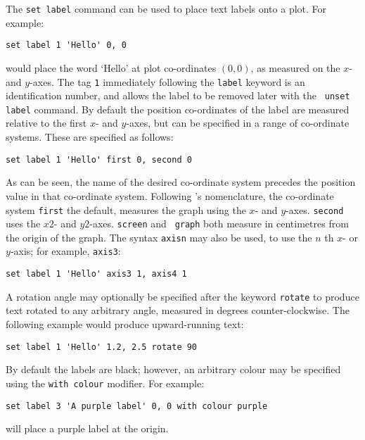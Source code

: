 The {\tt set label} command can be used to place text labels onto a plot.  For
example:

\begin{verbatim}
set label 1 'Hello' 0, 0
\end{verbatim}

\noindent would place the word `Hello' at plot co-ordinates $(0,0)$, as measured on the $x$-
and $y$-axes.  The tag {\tt 1} immediately following the {\tt label} keyword is an
identification number, and allows the label to be removed later with the {\tt
unset label} command.  By default the position co-ordinates of the label are
measured relative to the first $x$- and $y$-axes, but can be specified in a
range of co-ordinate systems. These are specified as follows:

\begin{verbatim}
set label 1 'Hello' first 0, second 0
\end{verbatim}

As can be seen, the name of the desired co-ordinate system precedes the position
value in that co-ordinate system. Following \gnuplot's nomenclature, the
co-ordinate system {\tt first} the default, measures the graph using the $x$- and
$y$-axes. {\tt second} uses the $x2$- and $y2$-axes.  {\tt screen} and {\tt
graph} both measure in centimetres from the origin of the graph.  The syntax
{\tt axisn} may also be used, to use the $n$ th $x$- or $y$-axis; for example,
{\tt axis3}:

\begin{verbatim}
set label 1 'Hello' axis3 1, axis4 1
\end{verbatim}

A rotation angle may optionally be specified after the keyword {\tt rotate}
to produce text rotated to any arbitrary angle, measured in degrees
counter-clockwise. The following example would produce upward-running text:

\begin{verbatim}
set label 1 'Hello' 1.2, 2.5 rotate 90
\end{verbatim}

By default the labels are black; however, an arbitrary colour may be specified
using the {\tt with colour} modifier.  For example:

\begin{verbatim}
set label 3 'A purple label' 0, 0 with colour purple
\end{verbatim}

\noindent will place a purple label at the origin.

